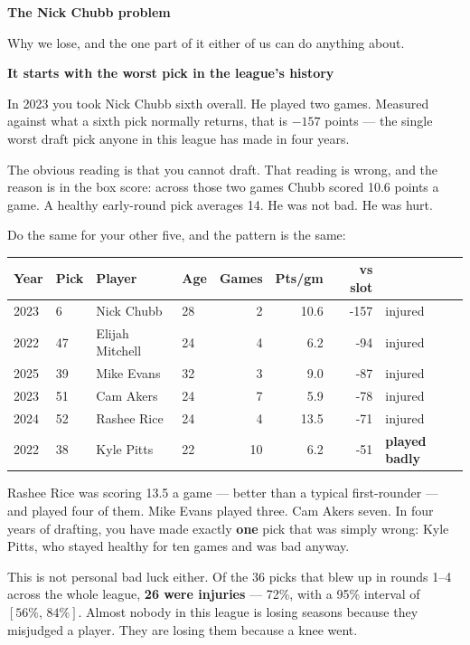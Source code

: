 \documentclass[11pt]{article}
\begin{document}
{\fontsize{20}{23}\selectfont\bfseries The Nick Chubb problem}

{\color{muted}\large Why we lose, and the one part of it either of us can do
anything about.}

\vspace{10pt}
{\large\bfseries It starts with the worst pick in the league's history}

In 2023 you took Nick Chubb sixth overall. He played two games. Measured against
what a sixth pick normally returns, that is $-157$ points --- the single worst
draft pick anyone in this league has made in four years.

The obvious reading is that you cannot draft. That reading is wrong, and the
reason is in the box score: across those two games Chubb scored 10.6 points a
game. A healthy early-round pick averages 14. He was not bad. He was hurt.

Do the same for your other five, and the pattern is the same:

\vspace{4pt}
\begin{tabular}{llllrrrl}
\toprule
Year & Pick & Player & Age & Games & Pts/gm & vs slot & \\
\midrule
2023 & 6 & Nick Chubb & 28 & 2 & 10.6 & -157 & injured \\
2022 & 47 & Elijah Mitchell & 24 & 4 & 6.2 & -94 & injured \\
2025 & 39 & Mike Evans & 32 & 3 & 9.0 & -87 & injured \\
2023 & 51 & Cam Akers & 24 & 7 & 5.9 & -78 & injured \\
2024 & 52 & Rashee Rice & 24 & 4 & 13.5 & -71 & injured \\
2022 & 38 & Kyle Pitts & 22 & 10 & 6.2 & -51 & \textbf{played badly} \\
\bottomrule
\end{tabular}

Rashee Rice was scoring 13.5 a game --- better than a typical first-rounder ---
and played four of them. Mike Evans played three. Cam Akers seven. In four years
of drafting, you have made exactly \textbf{one} pick that was simply wrong: Kyle
Pitts, who stayed healthy for ten games and was bad anyway.

This is not personal bad luck either. Of the 36 picks that blew up in rounds 1--4
across the whole league, \textbf{26 were injuries} --- 72\%, with a 95\% interval
of $[56\%,\,84\%]$. Almost nobody in this league is losing seasons because they
misjudged a player. They are losing them because a knee went.
\end{document}
